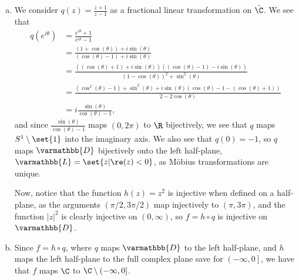 \documentclass[10pt]{mypackage}
\renewcommand*{\mathbb}[1]{\varmathbb{#1}}
\begin{document}
\begin{solution}\hfill
  \begin{enumerate}[(a)]
    \item We consider $q(z) = \frac{z+1}{z-1}$ as a fractional linear transformation on $\hat{\C}$. We see that
      \begin{align*}
        q\left( e^{i\theta} \right) &= \frac{e^{i\theta} + 1}{e^{i\theta} - 1}\\
                                    &= \frac{\left( 1+\cos\left( \theta \right) \right) + i\sin\left( \theta \right)}{\left( \cos\left( \theta \right) - 1 \right) + i\sin\left( \theta \right)}\\
                                    &= \frac{\left( \left( \cos\left( \theta \right) +1 \right) + i\sin\left( \theta \right) \right)\left( \left( \cos\left( \theta \right)-1 \right) - i\sin\left( \theta \right)  \right)}{\left( 1-\cos\left( \theta \right) \right)^2 + \sin^2\left( \theta \right)}\\
                                    &= \frac{\left( \cos^2\left( \theta \right) - 1 \right) + \sin^2\left( \theta \right) + i\sin\left( \theta \right)\left( \cos\left( \theta \right) - 1 - \left( \cos\left( \theta \right) + 1 \right) \right)}{2-2\cos\left( \theta \right)}\\
                                    &= i\frac{\sin\left( \theta \right)}{\cos\left( \theta \right)-1},
      \end{align*}
      and since $\frac{\sin\left( \theta \right)}{\cos\left( \theta \right)-1}$ maps $(0,2\pi) $ to $ \R$ bijectively, we see that $q$ maps $S^{1}\setminus \set{1}$ into the imaginary axis. We also see that $q(0) = -1$, so $q$ maps $\mathbb{D}$ bijectively onto the left half-plane, $ \mathbb{L} = \set{z | \re(z) < 0} $, as Möbius transformations are unique.\newline

      Now, notice that the function $h(z) = z^2$ is injective when defined on a half-plane, as the arguments $\left( \pi/2,3\pi/2 \right)$ map injectively to $\left( \pi,3\pi \right)$, and the function $\left\vert z \right\vert^2$ is clearly injective on $(0,\infty)$, so $f = h\circ q$ is injective on $ \mathbb{D} $.
    \item Since $f = h\circ q$, where $q$ maps $ \mathbb{D} $ to the left half-plane, and $h$ maps the left half-plane to the full complex plane save for $\left( -\infty,0 \right]$, we have that $f$ maps $\C$ to $\C\setminus (-\infty,0]$.
  \end{enumerate}
\end{solution}
\end{document}
